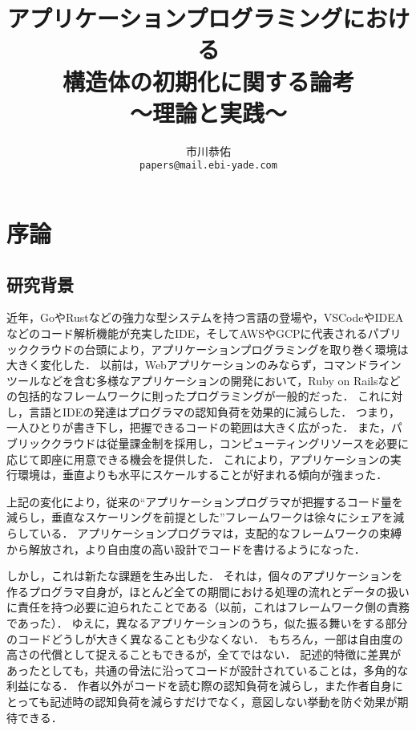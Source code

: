 \documentclass[a4paper,12pt]{jsreport}
\title{
\LARGE{アプリケーションプログラミングにおける\\構造体の初期化に関する論考}\\
\Large{〜理論と実践〜}
}
\author{市川恭佑\\\texttt{papers@mail.ebi-yade.com}}
\date{}
\begin{document}
\maketitle
{}
\tableofcontents
\newpage
\listoffigures
\listoftables
\newpage
{}
\newpage

\chapter{序論}
\section{研究背景}
近年，GoやRustなどの強力な型システムを持つ言語の登場や，VSCodeやIDEAなどのコード解析機能が充実したIDE，そしてAWSやGCPに代表されるパブリッククラウドの台頭により，アプリケーションプログラミングを取り巻く環境は大きく変化した．
以前は，Webアプリケーションのみならず，コマンドラインツールなどを含む多様なアプリケーションの開発において，Ruby on Railsなどの包括的なフレームワークに則ったプログラミングが一般的だった．
これに対し，言語とIDEの発達はプログラマの認知負荷を効果的に減らした．
つまり，一人ひとりが書き下し，把握できるコードの範囲は大きく広がった．
また，パブリッククラウドは従量課金制を採用し，コンピューティングリソースを必要に応じて即座に用意できる機会を提供した．
これにより，アプリケーションの実行環境は，垂直よりも水平にスケールすることが好まれる傾向が強まった．
\par
上記の変化により，従来の``アプリケーションプログラマが把握するコード量を減らし，垂直なスケーリングを前提とした''フレームワークは徐々にシェアを減らしている．
アプリケーションプログラマは，支配的なフレームワークの束縛から解放され，より自由度の高い設計でコードを書けるようになった．
\par
しかし，これは新たな課題を生み出した．
それは，個々のアプリケーションを作るプログラマ自身が，ほとんど全ての期間における処理の流れとデータの扱いに責任を持つ必要に迫られたことである（以前，これはフレームワーク側の責務であった）．
ゆえに，異なるアプリケーションのうち，似た振る舞いをする部分のコードどうしが大きく異なることも少なくない．
もちろん，一部は自由度の高さの代償として捉えることもできるが，全てではない．
記述的特徴に差異があったとしても，共通の骨法に沿ってコードが設計されていることは，多角的な利益になる．
作者以外がコードを読む際の認知負荷を減らし，また作者自身にとっても記述時の認知負荷を減らすだけでなく，意図しない挙動を防ぐ効果が期待できる．
\end{document}
